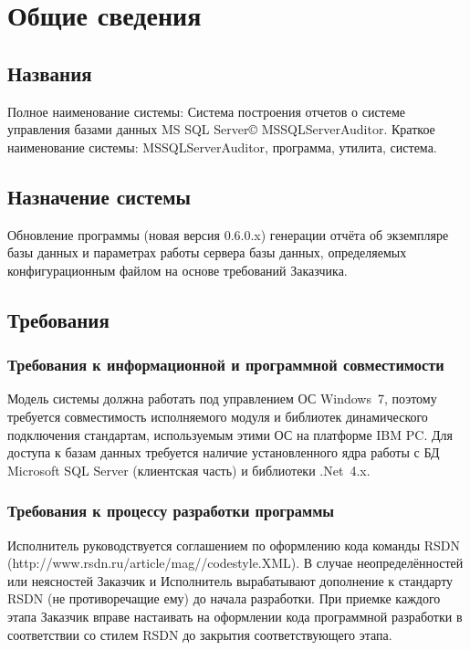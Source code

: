 \section{Общие сведения}

\subsection{Названия}

Полное наименование системы: Система построения отчетов о системе управления базами данных MS SQL
Server{\copyright} MSSQLServerAuditor. Краткое наименование системы: MSSQLServerAuditor, программа,
утилита, система.

\subsection{Назначение системы}

Обновление программы (новая версия 0.6.0.x) генерации отчёта об экземпляре базы данных и параметрах
работы сервера базы данных, определяемых конфигурационным файлом на основе требований Заказчика.

\subsection{Требования}

\subsubsection{Требования к информационной и программной совместимости}

Модель системы должна работать под управлением ОС Windows~7, поэтому требуется совместимость
исполняемого модуля и библиотек динамического подключения стандартам, используемым этими ОС на
платформе IBM PC. Для доступа к базам данных требуется наличие установленного ядра работы с БД
Microsoft SQL Server (клиентская часть) и библиотеки .Net~4.x.

\subsubsection{Требования к процессу разработки программы}

Исполнитель руководствуется соглашением по оформлению кода команды RSDN
(http://www.rsdn.ru/\-article\-/mag//\-codestyle.\-XML). В случае неопределённостей или
неясностей Заказчик и Исполнитель вырабатывают дополнение к стандарту RSDN (не противоречащие ему)
до начала разработки. При приемке каждого этапа Заказчик вправе настаивать на оформлении кода
программной разработки в соответствии со стилем RSDN до закрытия соответствующего этапа.

